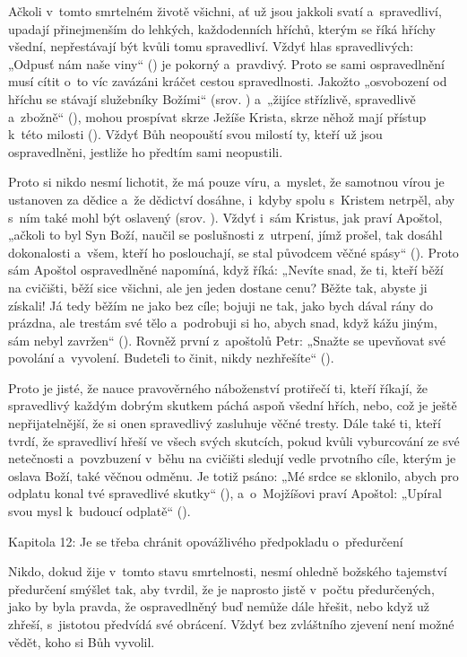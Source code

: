 Ačkoli v~tomto smrtelném životě všichni, ať už jsou jakkoli svatí a~spravedliví,
upadají přinejmenším do lehkých, každodenních hříchů, kterým se říká hříchy všední,
nepřestávají být kvůli tomu spravedliví. Vždyť hlas spravedlivých: „Odpusť nám naše
viny“ () je pokorný a~pravdivý. Proto se sami ospravedlnění musí cítit o~to
víc zavázáni kráčet cestou spravedlnosti. Jakožto „osvobození od hříchu se stávají
služebníky Božími“ (srov. ) a~„žijíce střízlivě, spravedlivě a~zbožně“ (), mohou prospívat skrze Ježíše Krista, skrze něhož mají přístup k~této milosti
(). Vždyť Bůh neopouští svou milostí ty, kteří už jsou ospravedlněni, jestliže
ho předtím sami neopustili.

Proto si nikdo nesmí lichotit, že má pouze víru, a~myslet, že samotnou vírou je ustanoven
za dědice a~že dědictví dosáhne, i~kdyby spolu s~Kristem netrpěl, aby s~ním také
mohl být oslavený (srov. ). Vždyť i~sám Kristus, jak praví Apoštol, „ačkoli
to byl Syn Boží, naučil se poslušnosti z~utrpení, jímž prošel, tak dosáhl dokonalosti
a~všem, kteří ho poslouchají, se stal původcem věčné spásy“ (). Proto sám
Apoštol ospravedlněné napomíná, když říká: „Nevíte snad, že ti, kteří běží na cvičišti,
běží sice všichni, ale jen jeden dostane cenu? Běžte tak, abyste ji získali! Já tedy
běžím ne jako bez cíle; bojuji ne tak, jako bych dával rány do prázdna, ale trestám
své tělo a~podrobuji si ho, abych snad, když kážu jiným, sám nebyl zavržen“ (). Rovněž první z~apoštolů Petr: „Snažte se upevňovat své povolání a~vyvolení.
Budete\=li to činit, nikdy nezhřešíte“ ().

Proto je jisté, že nauce pravověrného náboženství protiřečí ti, kteří říkají, že
spravedlivý každým dobrým skutkem páchá aspoň všední hřích, nebo, což je ještě nepřijatelnější,
že si onen spravedlivý zasluhuje věčné tresty. Dále také ti, kteří tvrdí, že spravedliví
hřeší ve všech svých skutcích, pokud kvůli vyburcování ze své netečnosti a~povzbuzení
v~běhu na cvičišti sledují vedle prvotního cíle, kterým je oslava Boží, také věčnou
odměnu. Je totiž psáno: „Mé srdce se sklonilo, abych pro odplatu konal tvé spravedlivé
skutky“ (), a~o~Mojžíšovi praví Apoštol: „Upíral svou mysl k~budoucí odplatě“
().

\chaptitle
Kapitola 12:
Je se třeba chránit opovážlivého předpokladu o~předurčení

Nikdo, dokud žije v~tomto stavu smrtelnosti, nesmí ohledně božského tajemství předurčení
smýšlet tak, aby tvrdil, že je naprosto jistě v~počtu předurčených, jako by byla
pravda, že ospravedlněný buď nemůže dále hřešit, nebo když už zhřeší, s~jistotou
předvídá své obrácení. Vždyť bez zvláštního zjevení není možné vědět, koho si Bůh
vyvolil.

